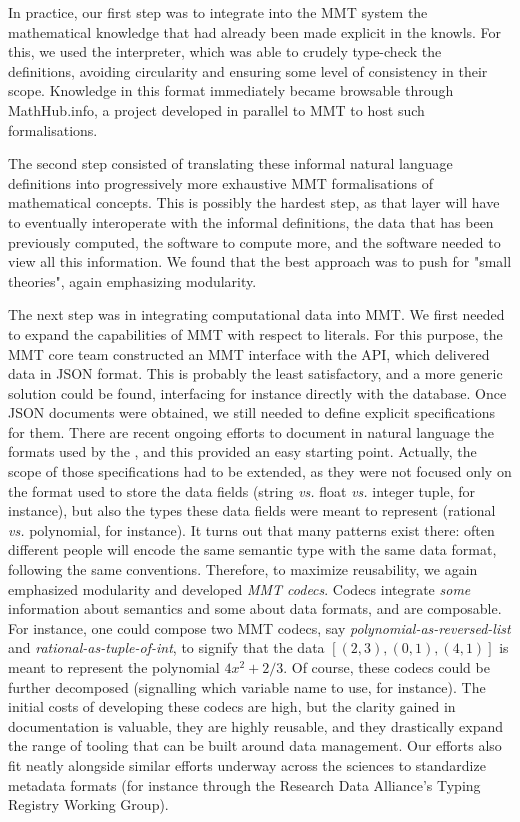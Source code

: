 In practice, our first step was to integrate into the MMT system the mathematical knowledge that had already been made explicit in the knowls. For this, we used the \stex interpreter, which was able to crudely type-check the definitions, avoiding circularity and ensuring some level of consistency in their scope. Knowledge in this format immediately became browsable through \textsf{MathHub.info}, a project developed in parallel to MMT to host such formalisations. 

The second step consisted of translating these informal natural language definitions into progressively more exhaustive MMT formalisations of mathematical concepts. This is possibly the hardest step, as that layer will have to eventually interoperate with the informal \stex definitions, the data that has been previously computed, the software to compute more, and the software needed to view all this information. We found that the best approach was to push for "small theories", again emphasizing modularity. 

The next step was in integrating computational data into MMT. We first needed to expand the capabilities of MMT with respect to literals. For this purpose, the MMT core team constructed an MMT interface with the \LMFDB API, which delivered data in JSON format. This is probably the least satisfactory, and a more generic solution could be found, interfacing for instance directly with the \Mongo database. 
Once JSON  documents were obtained, we still needed to define explicit specifications for them. There are recent ongoing efforts \cite{lmfdb-formats} to document in natural language the formats used by the \LMFDB, and this provided an easy starting point. Actually, the scope of those specifications had to be extended, as they were not focused only on the format used to store the data fields (string \emph{vs.} float \emph{vs.} integer tuple, for instance), but also the types these data fields were meant to represent (rational \emph{vs.} polynomial, for instance). It turns out that many patterns exist there: often different people will encode the same semantic type with the same data format, following the same conventions. Therefore, to maximize reusability, we again emphasized modularity and developed \emph{MMT codecs}. Codecs integrate \emph{some} information about semantics and some about data formats, and are composable. For instance,  one could compose two MMT codecs, say \emph{polynomial-as-reversed-list} and \emph{rational-as-tuple-of-int}, to signify that the data $[(2,3),(0,1),(4,1)]$ is meant to represent the polynomial $4x^2+2/3$. Of course, these codecs could be further decomposed (signalling which variable name to use, for instance). The initial costs of developing these codecs are high, but the clarity gained in documentation is valuable, they are highly reusable, and they drastically expand the range of tooling that can be built around data management. Our efforts also fit neatly alongside similar efforts underway across the sciences to standardize metadata formats (for instance through the Research Data Alliance's Typing Registry Working Group\cite{rda-typing}). 



